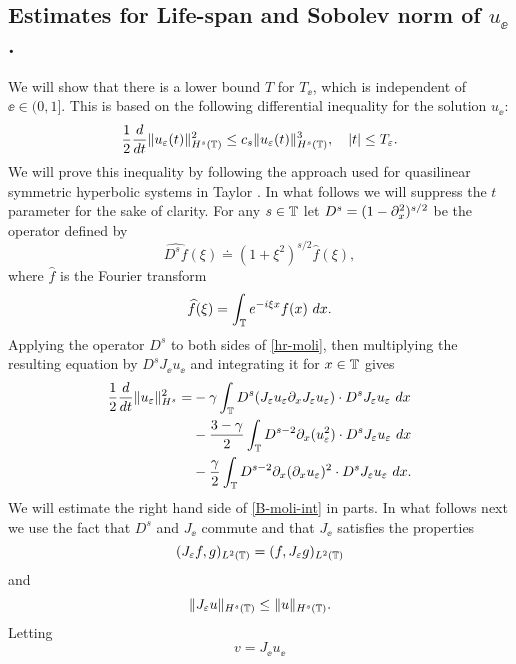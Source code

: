 \subsection{Estimates  for Life-span and Sobolev norm of $u_\ee$.}
%
We will show that there is a lower bound  $T$
for $T_\ee$, which is  independent of $\ee\in(0, 1]$.
This is based on the following differential
inequality for the solution $u_\ee$:
%
\begin{equation} 
\label{B-diff-ineq}
\frac 12
\frac{d}{dt}
\|u_\varepsilon(t)\|_{H^{s}(\mathbb{T})}^2
\le
c_s
\|u_\varepsilon(t)\|_{H^{s}(\mathbb{T})}^3,
\quad
|t| \le T_\varepsilon.
\end{equation}
%
%
We will prove this inequality  by
following the approach used for quasilinear symmetric
hyperbolic systems in Taylor \cite{Taylor:1991}. In what follows we will suppress the
$t$ parameter for the sake of clarity.
%
For any $s\in \mathbb{T}$ let   $D^s=(1-\partial_x^2)^{s/2}$ be the  operator
defined by 
%
$$ \widehat{D^s f}(\xi) \doteq (1 + \xi^2)^{s/2} \widehat{f}(\xi), $$
%
where $ \widehat{f}$ is the Fourier transform
%
$$ \widehat{f}(\xi) =  \int_{\mathbb{T}} e^{-i \xi x} f(x) \ dx.  $$
%
Applying the operator $D^s$ to  both sides of  \eqref{hr-moli},
then  multiplying the resulting equation by $D^s J_\ee u_\ee$
and integrating it for $x\in\mathbb{T}$ gives
%
\begin{equation} 
\begin{split}
\label{B-moli-int}
\frac 12
\frac{d}{dt} \|u_\varepsilon \|_{H^s}^2
=
&-
\gamma \int_{\mathbb{T}}  D^s(J_\varepsilon u_\varepsilon \partial_x J_\varepsilon u_\varepsilon) \cdot
D^s J_\varepsilon u_\varepsilon  \  dx
\\
&- \frac{3 -\gamma}{2} \int_{\mathbb{T}} D^{s-2} \partial_x (u_{\varepsilon}^2) 
\cdot D^s J_\varepsilon u_{\varepsilon} \ dx
\\
&- \frac{\gamma}{2} \int_{\mathbb{T}}  D^{s-2} \partial_x (\partial_x u_\varepsilon)^2
\cdot D^s J_\varepsilon u_\varepsilon  \ dx.
\end{split}
\end{equation}
%
We will estimate the right hand side of \eqref{B-moli-int} in parts. In
what follows next we use the fact that  $D^s$ and $J_\ee$ commute and
that  $J_\ee$ satisfies the properties 
%
\begin{equation} 
\label{J-e-inner-prod-property}
(J_\varepsilon f, g)_{L^2(\mathbb{T})}=( f, J_\varepsilon g)_{L^2(\mathbb{T})}
\end{equation}
%
and
%
\begin{equation} 
\label{Je-u-Hs}
\| J_\varepsilon u \|_{H^s(\mathbb{T})}
\le
\|  u \|_{H^s(\mathbb{T})}.
\end{equation}
%
%
%
%
\noindent
Letting 
%
\begin{equation} 
\label{v-Je-ue}
v=J_\ee u_\ee
\end{equation}
